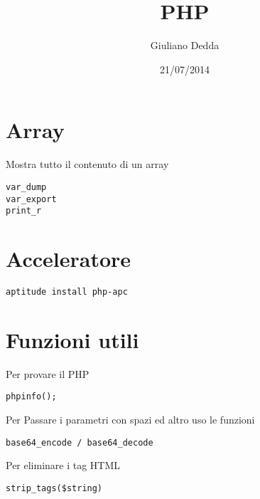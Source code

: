 \documentclass[]{article}
\title{PHP}
\author{Giuliano Dedda}
\date{21/07/2014}
\newenvironment{Shaded}{}{}
\newcommand{\KeywordTok}[1]{\textcolor[rgb]{0.00,0.44,0.13}{\textbf{{#1}}}}
\newcommand{\StringTok}[1]{\textcolor[rgb]{0.25,0.44,0.63}{{#1}}}
\newcommand{\OtherTok}[1]{\textcolor[rgb]{0.00,0.44,0.13}{{#1}}}
\newcommand{\FunctionTok}[1]{\textcolor[rgb]{0.02,0.16,0.49}{{#1}}}
\newcommand{\NormalTok}[1]{{#1}}
\begin{document}
\maketitle

\section{Array}\label{array}

\begin{Shaded}
\end{Shaded}

Mostra tutto il contenuto di un array

\begin{verbatim}
var_dump        
var_export
print_r     
\end{verbatim}

\section{Acceleratore}\label{acceleratore}

\begin{verbatim}
aptitude install php-apc
\end{verbatim}

\section{Funzioni utili}\label{funzioni-utili}

Per provare il PHP

\begin{verbatim}
phpinfo();
\end{verbatim}

Per Passare i parametri con spazi ed altro uso le funzioni

\begin{verbatim}
base64_encode / base64_decode
\end{verbatim}

Per eliminare i tag HTML

\begin{verbatim}
strip_tags($string) 
\end{verbatim}
\end{document}
